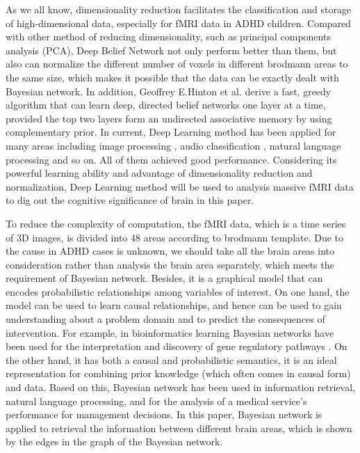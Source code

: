 \documentclass[10pt,twocolumn,letterpaper]{article}
\begin{document}
As we all know, dimensionality reduction facilitates the classification and storage of high-dimensional data, especially for fMRI data in ADHD children. Compared with other method of reducing dimensionality, such as principal components analysis (PCA), Deep Belief Network not only perform better than them, but also can normalize the different number of voxels in different brodmann areas to the same size, which makes it possible that the data can be exactly dealt with Bayesian network. In addition, Geoffrey E.Hinton et al.\cite{8} derive a fast, greedy algorithm that can learn deep, directed belief networks one layer at a time, provided the top two layers form an undirected associative memory by using complementary prior.  In current, Deep Learning method has been applied for many areas including image processing \cite{8}, audio classification \cite{9}, natural language processing \cite{12} and so on. All of them achieved good performance. Considering its powerful learning ability and advantage of dimensionality reduction and normalization, Deep Learning method will be used to analysis massive fMRI data to dig out the cognitive significance of brain in this paper.


To reduce the complexity of computation, the fMRI data, which is a time series of 3D images, is divided into 48 areas according to brodmann template. Due to the cause in ADHD cases is unknown, we should take all the brain areas into consideration rather than analysis the brain area separately, which meets the requirement of Bayesian network. Besides, it is a graphical model that can encodes probabilistic relationships among variables of interest. On one hand, the model can be used to learn causal relationships, and hence can be used to gain understanding about a problem domain and to predict the consequences of intervention. For example, in bioinformatics learning Bayesian networks have been used for the interpretation and discovery of gene regulatory pathways \cite{14}. On the other hand, it has both a causal and probabilistic semantics, it is an ideal representation for combining prior knowledge (which often comes in causal form) and data. Based on this, Bayesian network has been used in information retrieval\cite{15}, natural language processing\cite{16}, and for the analysis of a medical service’s performance for management decisions\cite{17}. In this paper, Bayesian network is applied to retrieval the information between different brain areas, which is shown by the edges in the graph of the Bayesian network.  
\end{document}
